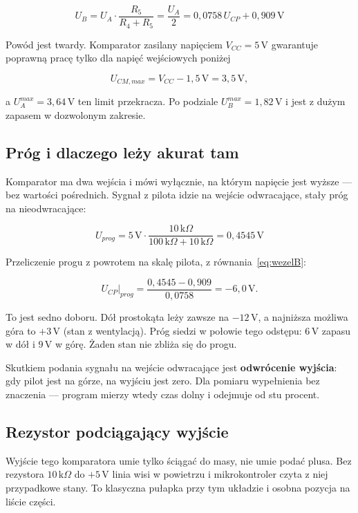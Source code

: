 \documentclass[a4paper,11pt]{article}
\newcommand{\kohm}{\,\mathrm{k}\Omega}
\newcommand{\volt}{\,\mathrm{V}}
\begin{document}
\begin{equation}
U_B=U_A\cdot\frac{R_5}{R_4+R_5}=\frac{U_A}{2}=0{,}0758\,U_{CP}+0{,}909\volt
\label{eq:wezelB}
\end{equation}

Powód jest twardy. Komparator zasilany napięciem $V_{CC}=5\volt$ gwarantuje
poprawną pracę tylko dla napięć wejściowych poniżej

\[
U_{CM,max}=V_{CC}-1{,}5\volt=3{,}5\volt ,
\]

a $U_A^{max}=3{,}64\volt$ ten limit przekracza. Po podziale
$U_B^{max}=1{,}82\volt$ i jest z dużym zapasem w dozwolonym zakresie.

\subsection{Próg i dlaczego leży akurat tam}

Komparator ma dwa wejścia i mówi wyłącznie, na którym napięcie jest wyższe --- bez
wartości pośrednich. Sygnał z pilota idzie na wejście odwracające, stały próg na
nieodwracające:

\begin{equation}
U_{prog}=5\volt\cdot\frac{10\kohm}{100\kohm+10\kohm}=0{,}4545\volt
\label{eq:prog}
\end{equation}

Przeliczenie progu z powrotem na skalę pilota, z równania~\eqref{eq:wezelB}:

\[
U_{CP}\big|_{prog}=\frac{0{,}4545-0{,}909}{0{,}0758}=-6{,}0\volt .
\]

To jest sedno doboru. Dół prostokąta leży zawsze na $-12\volt$, a najniższa możliwa
góra to $+3\volt$ (stan z wentylacją). Próg siedzi w połowie tego odstępu: $6\volt$
zapasu w dół i $9\volt$ w górę. Żaden stan nie zbliża się do progu.

Skutkiem podania sygnału na wejście odwracające jest \textbf{odwrócenie wyjścia}:
gdy pilot jest na górze, na wyjściu jest zero. Dla pomiaru wypełnienia bez
znaczenia --- program mierzy wtedy czas dolny i odejmuje od stu procent.

\subsection{Rezystor podciągający wyjście}

Wyjście tego komparatora umie tylko ściągać do masy, nie umie podać plusa. Bez
rezystora $10\kohm$ do $+5\volt$ linia wisi w powietrzu i mikrokontroler czyta z niej
przypadkowe stany. To klasyczna pułapka przy tym układzie i osobna pozycja na
liście części.
\end{document}
